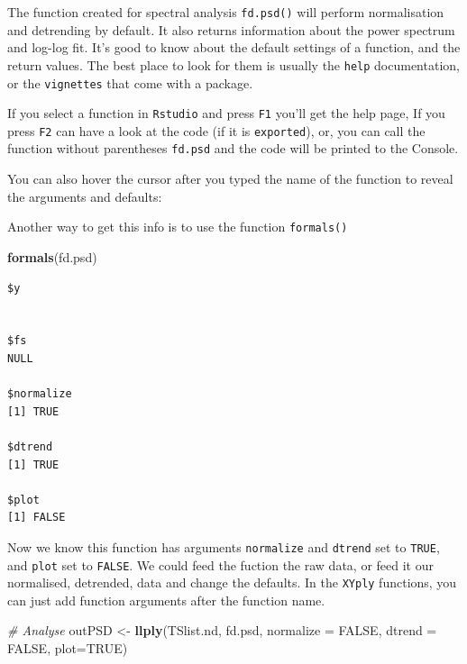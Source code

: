\documentclass[]{book}
\newenvironment{Shaded}{\begin{snugshade}}{\end{snugshade}}
\newcommand{\KeywordTok}[1]{\textcolor[rgb]{0.13,0.29,0.53}{\textbf{{#1}}}}
\newcommand{\DataTypeTok}[1]{\textcolor[rgb]{0.13,0.29,0.53}{{#1}}}
\newcommand{\StringTok}[1]{\textcolor[rgb]{0.31,0.60,0.02}{{#1}}}
\newcommand{\CommentTok}[1]{\textcolor[rgb]{0.56,0.35,0.01}{\textit{{#1}}}}
\newcommand{\OtherTok}[1]{\textcolor[rgb]{0.56,0.35,0.01}{{#1}}}
\newcommand{\NormalTok}[1]{{#1}}
\begin{document}
The function created for spectral analysis \texttt{fd.psd()} will
perform normalisation and detrending by default. It also returns
information about the power spectrum and log-log fit. It's good to know
about the default settings of a function, and the return values. The
best place to look for them is usually the \texttt{help} documentation,
or the \texttt{vignettes} that come with a package.

If you select a function in \texttt{Rstudio} and press \texttt{F1}
you'll get the help page, If you press \texttt{F2} can have a look at
the code (if it is \texttt{exported}), or, you can call the function
without parentheses \texttt{fd.psd} and the code will be printed to the
Console.

You can also hover the cursor after you typed the name of the function
to reveal the arguments and defaults:

Another way to get this info is to use the function \texttt{formals()}

\begin{Shaded}
\begin{Highlighting}[]
\KeywordTok{formals}\NormalTok{(fd.psd)}
\end{Highlighting}
\end{Shaded}

\begin{verbatim}
$y


$fs
NULL

$normalize
[1] TRUE

$dtrend
[1] TRUE

$plot
[1] FALSE
\end{verbatim}

Now we know this function has arguments \texttt{normalize} and
\texttt{dtrend} set to \texttt{TRUE}, and \texttt{plot} set to
\texttt{FALSE}. We could feed the fuction the raw data, or feed it our
normalised, detrended, data and change the defaults. In the
\texttt{XYply} functions, you can just add function arguments after the
function name.

\begin{Shaded}
\begin{Highlighting}[]
\CommentTok{# Analyse}
\NormalTok{outPSD <-}\StringTok{ }\KeywordTok{llply}\NormalTok{(TSlist.nd, fd.psd, }\DataTypeTok{normalize =} \OtherTok{FALSE}\NormalTok{, }\DataTypeTok{dtrend =} \OtherTok{FALSE}\NormalTok{, }\DataTypeTok{plot=}\OtherTok{TRUE}\NormalTok{)}
\end{Highlighting}
\end{Shaded}
\end{document}

